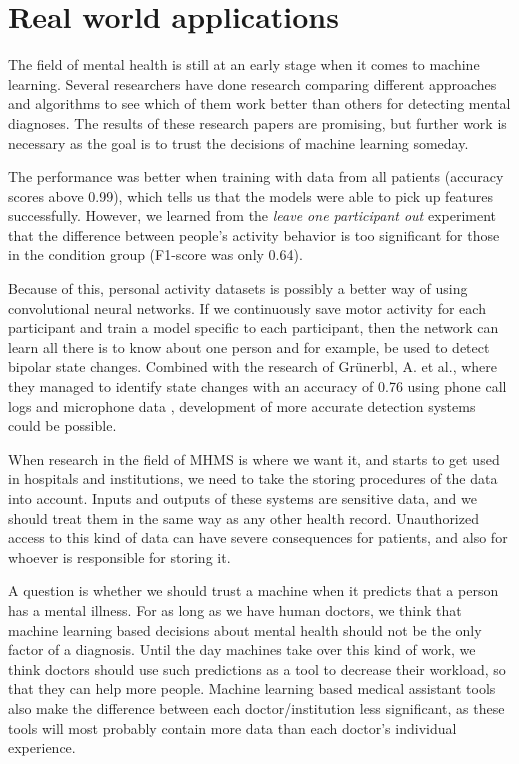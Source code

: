 \section{Real world applications}

The field of mental health is still at an early stage when it comes to machine learning. Several researchers have done research comparing different approaches and algorithms to see which of them work better than others for detecting mental diagnoses. The results of these research papers are promising, but further work is necessary as the goal is to trust the decisions of machine learning someday. 

The performance was better when training with data from all patients (accuracy scores above 0.99), which tells us that the models were able to pick up features successfully. However, we learned from the \textit{leave one participant out} experiment that the difference between people's activity behavior is too significant for those in the condition group (F1-score was only 0.64). 

Because of this, personal activity datasets is possibly a better way of using convolutional neural networks. If we continuously save motor activity for each participant and train a model specific to each participant, then the network can learn all there is to know about one person and for example, be used to detect bipolar state changes. Combined with the research of Grünerbl, A. et al., where they managed to identify state changes with an accuracy of 0.76 using phone call logs and microphone data \cite{grunerbl_smartphone_bipolar}, development of more accurate detection systems could be possible.

When research in the field of MHMS is where we want it, and starts to get used in hospitals and institutions, we need to take the storing procedures of the data into account. Inputs and outputs of these systems are sensitive data, and we should treat them in the same way as any other health record. Unauthorized access to this kind of data can have severe consequences for patients, and also for whoever is responsible for storing it. 

A question is whether we should trust a machine when it predicts that a person has a mental illness. For as long as we have human doctors, we think that machine learning based decisions about mental health should not be the only factor of a diagnosis. Until the day machines take over this kind of work, we think doctors should use such predictions as a tool to decrease their workload, so that they can help more people. Machine learning based medical assistant tools also make the difference between each doctor/institution less significant, as these tools will most probably contain more data than each doctor's individual experience.  